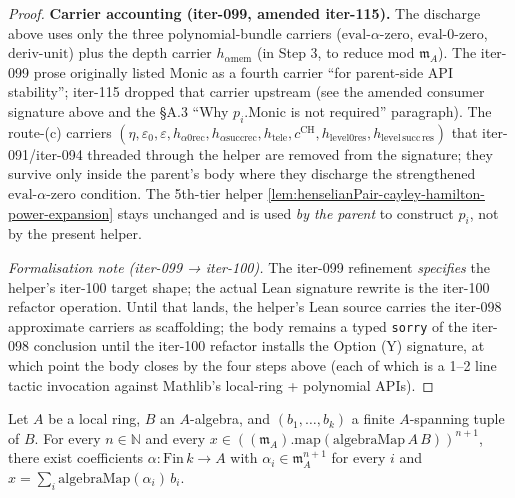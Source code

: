 \begin{proof}
\textbf{Carrier accounting (iter-099, amended iter-115).}
The discharge above uses only the three polynomial-bundle carriers
($\mathrm{eval}\text{-}\alpha\text{-}\mathrm{zero}$,
$\mathrm{eval}\text{-}0\text{-}\mathrm{zero}$,
$\mathrm{deriv}\text{-}\mathrm{unit}$) plus the depth carrier
$h_{\alpha\mathrm{mem}}$ (in Step 3, to reduce mod $\mathfrak m_A$).
The iter-099 prose originally listed Monic as a fourth carrier
``for parent-side API stability''; iter-115 dropped that carrier
upstream (see the amended consumer signature above and the §A.3
``Why $p_i.\mathrm{Monic}$ is not required'' paragraph).
The route-(c) carriers
$(\eta, \varepsilon_0, \varepsilon,
h_{\alpha 0\mathrm{rec}}, h_{\alpha\mathrm{succ}\mathrm{rec}},
h_{\mathrm{tele}}, c^{\mathrm{CH}},
h_{\mathrm{level} 0\mathrm{res}}, h_{\mathrm{level\,succ\,res}})$
that iter-091/iter-094 threaded through the helper are removed
from the signature; they survive only inside the parent's body
where they discharge the strengthened
$\mathrm{eval}\text{-}\alpha\text{-}\mathrm{zero}$ condition.
The 5th-tier helper
\cref{lem:henselianPair-cayley-hamilton-power-expansion} stays
unchanged and is used \emph{by the parent} to construct
$p_i$, not by the present helper.

\textit{Formalisation note (iter-099 → iter-100).} The iter-099
refinement \emph{specifies} the helper's iter-100 target shape;
the actual Lean signature rewrite is the iter-100 refactor
operation. Until that lands, the helper's Lean source carries the
iter-098 approximate carriers as scaffolding; the body remains a
typed \texttt{sorry} of the iter-098 conclusion until the
iter-100 refactor installs the Option (Y) signature, at which
point the body closes by the four steps above (each of which is
a 1--2 line tactic invocation against Mathlib's local-ring +
polynomial APIs).
\end{proof}

\begin{lemma}
\label{lem:henselianPair-exists-mAB-pow-decomposition-in-basis}
Let $A$ be a local ring, $B$ an $A$-algebra, and
$(b_1, \ldots, b_k)$ a finite $A$-spanning tuple of $B$. For every
$n \in \mathbb N$ and every
$x \in ((\mathfrak m_A).\mathrm{map}(\mathrm{algebraMap}\,A\,B))^{n+1}$,
there exist coefficients $\alpha : \mathrm{Fin}\,k \to A$ with
$\alpha_i \in \mathfrak m_A^{n+1}$ for every $i$ and
$x = \sum_i \mathrm{algebraMap}(\alpha_i)\,b_i$.
\end{lemma}

